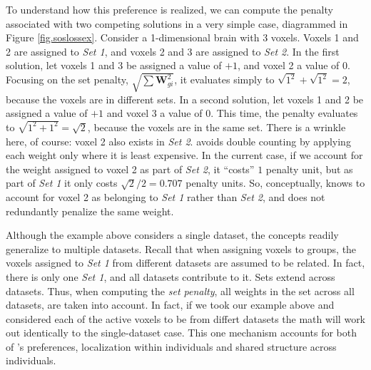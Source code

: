 To understand how this preference is realized, we can compute the penalty associated with two competing solutions in a very simple case, diagrammed in Figure \ref{fig.soslossex}. Consider a 1-dimensional brain with 3 voxels. Voxels 1 and 2 are assigned to {\em Set 1}, and voxels 2 and 3 are assigned to {\em Set 2}. In the first solution, let voxels 1 and 3 be assigned a value of $+1$, and voxel 2 a value of $0$. Focusing on the set penalty, $\sqrt{\sum{\mathbf{W}^2_{gi}}}$, it evaluates simply to $\sqrt{1^2} + \sqrt{1^2}=2$, because the voxels are in different sets. In a second solution, let voxels 1 and 2 be assigned a value of $+1$ and voxel 3 a value of $0$. This time, the penalty evaluates to $\sqrt{1^2+1^2}=\sqrt{2}$, because the voxels are in the same set. There is a wrinkle here, of course: voxel 2 also exists in {\em Set 2}. {\soslasso} avoids double counting by applying each weight only where it is least expensive.  In the current case, if we account for the weight assigned to voxel 2 as part of {\em Set 2}, it ``costs'' $1$ penalty unit, but as part of {\em Set 1} it only costs $\sqrt{2}/2=0.707$ penalty units. So, conceptually, {\soslasso} knows to account for voxel 2 as belonging to {\em Set 1} rather than {\em Set 2}, and does not redundantly penalize the same weight.

Although the example above considers a single dataset, the concepts readily generalize to multiple datasets. Recall that when assigning voxels to groups, the voxels assigned to {\em Set 1} from different datasets are assumed to be related. In fact, there is only one {\em Set 1}, and all datasets contribute to it. Sets extend across datasets. Thus, when computing the {\em set penalty}, all weights in the set across all datasets, are taken into account.  In fact, if we took our example above and considered each of the active voxels to be from differt datasets the math will work out identically to the single-dataset case. This one mechanism accounts for both of  {\soslasso} 's preferences, localization within individuals and shared structure across individuals.

